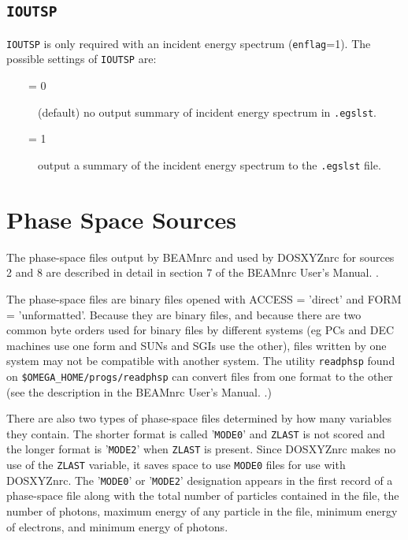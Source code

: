 \documentclass[12pt,twoside]{article}      %
\newcommand{\indexm}[1]{\index{#1}}
\begin{document}
\subsection{{\tt IOUTSP}}
\indexm{IOUTSP}
{\tt IOUTSP} is only required with an incident energy spectrum ({\tt enflag}=1).  The
possible settings of {\tt IOUTSP} are:

\begin{description}
\item [~~~~= 0] (default) no output summary of incident energy spectrum
in {\tt .egslst}.
\item [~~~~= 1] output a summary of the incident energy spectrum to the
{\tt .egslst} file.
\end{description}

\section{Phase Space Sources}

The phase-space files output by BEAMnrc and used by DOSXYZnrc for sources 2 and 8 are
described in detail in section 7 of the BEAMnrc User's Manual.
\cite{Ro04a}.

The phase-space files are binary files  opened with ACCESS = 'direct' and
FORM = 'unformatted'.  Because they are binary files, and because there
are two common byte orders used for binary files by different systems
(eg PCs and DEC machines use one form and SUNs and SGIs use the other),
files written by one system may not be compatible with another system.
The utility {\tt readphsp} found on {\tt \$OMEGA\_HOME/progs/readphsp} can
convert files from one format to the other (see the description in the BEAMnrc
User's Manual. \cite{Ro04a}.)

There are also two types of phase-space files determined by how many
variables they contain.  The shorter format is
called '{\tt MODE0}' and  {\tt ZLAST} is not
scored and the longer format is
'{\tt MODE2}' when {\tt ZLAST} is present.  Since DOSXYZnrc makes no use of
the {\tt ZLAST} variable, it saves space to use {\tt MODE0} files for use with
DOSXYZnrc.  The '{\tt MODE0}' or '{\tt MODE2}'
designation appears in the first record of a phase-space file along
with the total number of particles contained in the file, the number
of photons, maximum energy of any particle in the file,
minimum energy of electrons, and minimum energy of
photons.
\end{document}
